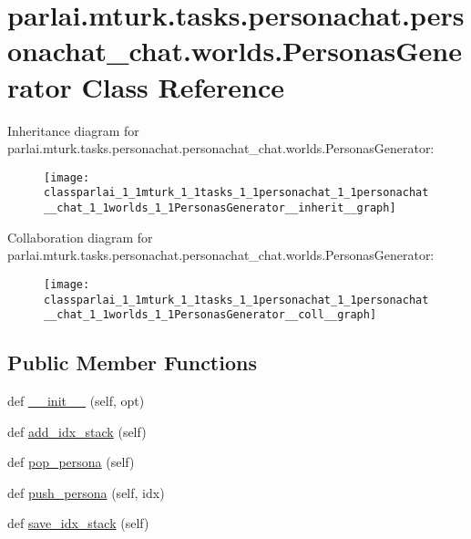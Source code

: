 \hypertarget{classparlai_1_1mturk_1_1tasks_1_1personachat_1_1personachat__chat_1_1worlds_1_1PersonasGenerator}{}\section{parlai.\+mturk.\+tasks.\+personachat.\+personachat\+\_\+chat.\+worlds.\+Personas\+Generator Class Reference}
\label{classparlai_1_1mturk_1_1tasks_1_1personachat_1_1personachat__chat_1_1worlds_1_1PersonasGenerator}


Inheritance diagram for parlai.\+mturk.\+tasks.\+personachat.\+personachat\+\_\+chat.\+worlds.\+Personas\+Generator\+:
\nopagebreak
\begin{figure}[H]
\begin{center}
\leavevmode
\texttt{[image: classparlai\_1\_1mturk\_1\_1tasks\_1\_1personachat\_1\_1personachat\_\_chat\_1\_1worlds\_1\_1PersonasGenerator\_\_inherit\_\_graph]}
\end{center}
\end{figure}


Collaboration diagram for parlai.\+mturk.\+tasks.\+personachat.\+personachat\+\_\+chat.\+worlds.\+Personas\+Generator\+:
\nopagebreak
\begin{figure}[H]
\begin{center}
\leavevmode
\texttt{[image: classparlai\_1\_1mturk\_1\_1tasks\_1\_1personachat\_1\_1personachat\_\_chat\_1\_1worlds\_1\_1PersonasGenerator\_\_coll\_\_graph]}
\end{center}
\end{figure}
\subsection*{Public Member Functions}
\begin{DoxyCompactItemize}
\item 
def \hyperlink{classparlai_1_1mturk_1_1tasks_1_1personachat_1_1personachat__chat_1_1worlds_1_1PersonasGenerator_a5d28818c8d8f07d9f0fa0fdac8a9f516}{\+\_\+\+\_\+init\+\_\+\+\_\+} (self, opt)
\item 
def \hyperlink{classparlai_1_1mturk_1_1tasks_1_1personachat_1_1personachat__chat_1_1worlds_1_1PersonasGenerator_a432b4b3a15961d806c89e1a9c840bd4b}{add\+\_\+idx\+\_\+stack} (self)
\item 
def \hyperlink{classparlai_1_1mturk_1_1tasks_1_1personachat_1_1personachat__chat_1_1worlds_1_1PersonasGenerator_a30fafb7faad8a5ad1c0c15bb2e1789f8}{pop\+\_\+persona} (self)
\item 
def \hyperlink{classparlai_1_1mturk_1_1tasks_1_1personachat_1_1personachat__chat_1_1worlds_1_1PersonasGenerator_a378e086892092b573b4e4014e8d6abc5}{push\+\_\+persona} (self, idx)
\item 
def \hyperlink{classparlai_1_1mturk_1_1tasks_1_1personachat_1_1personachat__chat_1_1worlds_1_1PersonasGenerator_a49c91f6d43cf77f815700b6837f0400d}{save\+\_\+idx\+\_\+stack} (self)
\end{DoxyCompactItemize}
